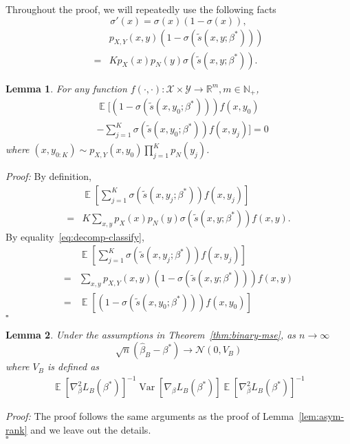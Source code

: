 \documentclass[11pt,a4paper]{article}
\newcommand{\qed}{\square}
\DeclareMathOperator{\E}{\mathbb{E}}
\newcommand{\var}{\operatorname{Var}}
\newcommand{\wt}[1]{\widetilde{#1}}
\newcommand{\wh}[1]{\widehat{#1}}
\newcommand{\gbeta}{\nabla_{\beta}}
\newcommand{\px}{p_X}
\newcommand{\sbc}[3]{\wt{s}(#1, #2; #3)}
\newtheorem{lemma}{Lemma}[section]
\begin{document}
Throughout the proof, we will repeatedly use the following facts 
\begin{equation}
  \sigma'(x) = \sigma(x)(1-\sigma(x)),
  \label{eq:derivative-sigmoid}
\end{equation}
\begin{equation}
\begin{aligned}
   & p_{X, Y}(x, y)(1-\sigma( \sbc{x}{y}{\beta^*})) \\
   = & K\px(x) p_N(y)\sigma(\sbc{x}{y}{\beta^*}).
\end{aligned}
  \label{eq:decomp-classify}
\end{equation}
\begin{lemma}
For any function $f(\cdot, \cdot): \mathcal{X}\times\mathcal{Y} \rightarrow \mathbb{R}^m, m\in\mathbb{N}_+$, 
\begin{equation*}
\begin{aligned}
  & \E \Big[ \left(1-\sigma( \sbc{x}{y_0}{\beta^*})\right) f(x, y_0)  \\ 
  & - \sum_{j=1}^K\sigma( \sbc{x}{y_0}{\beta^*} ) f(x, y_j)\Big] = 0
\end{aligned}
\end{equation*}
where $(x, y_{0:K})\sim p_{X, Y}(x, y_0)\prod_{j=1}^K p_N(y_j)$.
\label{lem:integral-classify}
\end{lemma}
{\em Proof: }
By definition, 
\begin{equation*}
\begin{aligned}
 & \E\left[\sum_{j=1}^K\sigma( \sbc{x}{y_j}{\beta^*}) f(x, y_j) \right] \\
= &  K\sum_{x, y} \px(x)p_N(y)\sigma(\sbc{x}{y}{\beta^*}) f(x, y).
\end{aligned}
\end{equation*}
By equality~\eqref{eq:decomp-classify}, 
\begin{equation*}
\begin{aligned}
    & \E\left[\sum_{j=1}^K\sigma( \sbc{x}{y_j}{\beta^*}) f(x, y_j) \right] \\
  = & \sum_{x, y} p_{X, Y}(x, y) (1-\sigma(\sbc{x}{y}{\beta^*}))f(x, y)\\
  = & \E[(1-\sigma(\sbc{x}{y_0}{\beta^*})) f(x, y_0)]
\end{aligned}
\end{equation*}
$\qed$

\begin{lemma}
  Under the assumptions in Theorem~\ref{thm:binary-mse}, as $n\rightarrow\infty$
\[
  \sqrt{n}\left(\wh{\beta}_B - \beta^*\right) \rightarrow \mathcal{N}\left(0, V_B\right)
\]
where $V_B$ is defined as 
\begin{equation*}
\begin{aligned}
\E \left[\gbeta^2 L_B(\beta^*)\right]^{-1} \var \left[\gbeta L_B(\beta^*) \right] \E \left[\gbeta^2 L_B(\beta^*)\right]^{-1} 
\end{aligned}
\end{equation*}
\label{lem:asym-binary}
\end{lemma}
{\em Proof: } The proof follows the same arguments as the proof of Lemma~\ref{lem:asym-rank} and we leave out the details.\\ 
$\qed$
\end{document}
